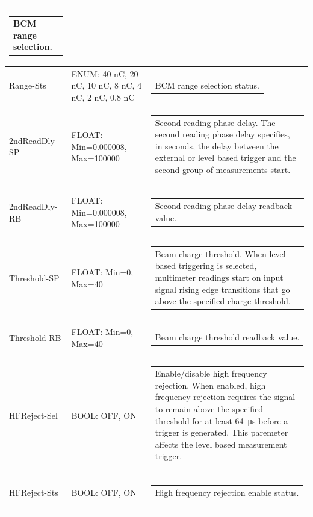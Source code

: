 \documentclass[openany]{article}
\begin{document}
\begin{longtable}{| m{3.0cm} m{4.5cm} m{7.0cm} |}
\begin{tabular}{@{}m{6cm}@{}}
	    					BCM range selection.
						\end{tabular} \\ \hline
		Range-Sts & ENUM: 40 nC, 20 nC, 10 nC, 8 nC, 4 nC, 2 nC, 0.8 nC & \begin{tabular}{@{}m{6cm}@{}}
	    					BCM range selection status.
						\end{tabular} \\ \hline
		2ndReadDly-SP & FLOAT: Min=0.000008, Max=100000 & \begin{tabular}{@{}m{6cm}@{}}
	    					Second reading phase delay. The second reading phase delay specifies, in seconds, the delay between the external or level based trigger and the second group of measurements start.
						\end{tabular} \\ \hline
		2ndReadDly-RB & FLOAT: Min=0.000008, Max=100000 & \begin{tabular}{@{}m{6cm}@{}}
	    					Second reading phase delay readback value.
						\end{tabular} \\ \hline
		Threshold-SP & FLOAT: Min=0, Max=40 & \begin{tabular}{@{}m{6cm}@{}}
	    					Beam charge threshold. When level based triggering is selected, multimeter readings start on input signal rising edge transitions that go above the specified charge threshold.
						\end{tabular} \\ \hline
		Threshold-RB & FLOAT: Min=0, Max=40 & \begin{tabular}{@{}m{6cm}@{}}
	    					Beam charge threshold readback value.
						\end{tabular} \\ \hline
		HFReject-Sel & BOOL: OFF, ON & \begin{tabular}{@{}m{6cm}@{}}
	    					Enable/disable high frequency rejection. When enabled, high frequency rejection requires the signal to remain above the specified threshold for at least \SI{64}{\micro\second} before a trigger is generated. This paremeter affects the level based measurement trigger.
						\end{tabular} \\ \hline
		HFReject-Sts & BOOL: OFF, ON & \begin{tabular}{@{}m{6cm}@{}}
	    					High frequency rejection enable status.
						\end{tabular} \\ \hline

\end{longtable}
\end{document}
